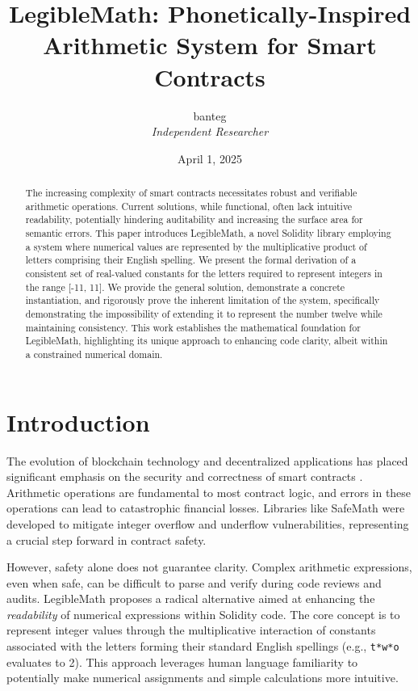 \documentclass[12pt,a4paper]{article}
\title{\textbf{LegibleMath: Phonetically-Inspired Arithmetic System for Smart Contracts}}
\author{banteg \\ \textit{Independent Researcher}}
\date{April 1, 2025}
\theoremstyle{plain}
\theoremstyle{definition}
\begin{document}
\maketitle

\begin{abstract}
\noindent The increasing complexity of smart contracts necessitates robust and verifiable arithmetic operations. Current solutions, while functional, often lack intuitive readability, potentially hindering auditability and increasing the surface area for semantic errors. This paper introduces LegibleMath, a novel Solidity library employing a system where numerical values are represented by the multiplicative product of letters comprising their English spelling. We present the formal derivation of a consistent set of real-valued constants for the letters required to represent integers in the range [-11, 11]. We provide the general solution, demonstrate a concrete instantiation, and rigorously prove the inherent limitation of the system, specifically demonstrating the impossibility of extending it to represent the number twelve while maintaining consistency. This work establishes the mathematical foundation for LegibleMath, highlighting its unique approach to enhancing code clarity, albeit within a constrained numerical domain.
\end{abstract}

\section{Introduction}

The evolution of blockchain technology and decentralized applications has placed significant emphasis on the security and correctness of smart contracts \cite{solidity_docs}. Arithmetic operations are fundamental to most contract logic, and errors in these operations can lead to catastrophic financial losses. Libraries like SafeMath \cite{safemath} were developed to mitigate integer overflow and underflow vulnerabilities, representing a crucial step forward in contract safety.

However, safety alone does not guarantee clarity. Complex arithmetic expressions, even when safe, can be difficult to parse and verify during code reviews and audits. LegibleMath proposes a radical alternative aimed at enhancing the \emph{readability} of numerical expressions within Solidity code. The core concept is to represent integer values through the multiplicative interaction of constants associated with the letters forming their standard English spellings (e.g., \texttt{t*w*o} evaluates to 2). This approach leverages human language familiarity to potentially make numerical assignments and simple calculations more intuitive.
\end{document}

